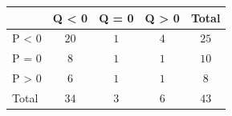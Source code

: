 \begin{tabular}{l|ccc|c}
\toprule
 & Q \textless{} 0 & Q = 0 & Q \textgreater{} 0 & Total \\
\midrule
P \textless{} 0 & $20$ & $1$ & $4$ & $25$ \\
P = 0 & $8$ & $1$ & $1$ & $10$ \\
P \textgreater{} 0 & $6$ & $1$ & $1$ & $8$ \\
\midrule
Total & $34$ & $3$ & $6$ & $43$ \\
\end{tabular}
